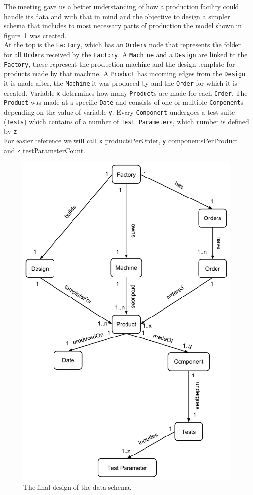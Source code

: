 The meeting gave us a better understanding of how a production facility could handle its data and with that in mind and the objective to design a simpler schema that includes to most necessary parts of production the model shown in figure~\ref{fig:finalDesignOfSchema} was created. \\
At the top is the \texttt{Factory},
which has an \texttt{Orders} node that represents the folder for all \texttt{Order}s received by the \texttt{Factory}.
A \texttt{Machine} and a \texttt{Design} are linked to the \texttt{Factory},
these represent the production machine and the design template for products made by that machine.
A \texttt{Product} has incoming edges from the \texttt{Design} it is made after, the \texttt{Machine} it was produced by and the \texttt{Order} for which it is created.
Variable \texttt{x} determines how many \texttt{Product}s are made for each \texttt{Order}.
The \texttt{Product} was made at a specific \texttt{Date} and consists of one or multiple \texttt{Component}s depending on the value of variable \texttt{y}.
Every \texttt{Component} undergoes a test suite (\texttt{Tests}) which contains of a number of \texttt{Test Parameter}s,
which number is defined by \texttt{z}.\\
For easier reference we will call \texttt{x} productsPerOrder, \texttt{y} componentsPerProduct and \texttt{z} testParameterCount.

\begin{figure}
  \centering
  \includegraphics[width=.75\textwidth]{images/design/dataStructure}
  \caption{The final design of the data schema.}
  \label{fig:finalDesignOfSchema}
\end{figure}

